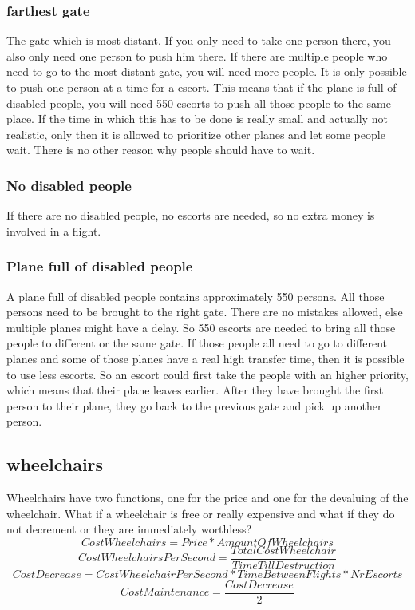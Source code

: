 \documentclass[a4paper, 11pt, notitlepage]{report}
\begin{document}
\subsubsection{farthest gate}
The gate which is most distant. If you only need to take one person there, you also only need one person to push him there. If there are multiple people who need to go to the most distant gate, you will need more people. It is only possible to push one person at a time for a escort. This means that if the plane is full of disabled people, you will need 550 escorts to push all those people to the same place. If the time in which this has to be done is really small and actually not realistic, only then it is allowed to prioritize other planes and let some people wait. There is no other reason why people should have to wait.
\subsubsection{No disabled people}
If there are no disabled people, no escorts are needed, so no extra money is involved in a flight.
\subsubsection{Plane full of disabled people}
A plane full of disabled people contains approximately 550 persons. All those persons need to be brought to the right gate. There are no mistakes allowed, else multiple planes might have a delay. So 550 escorts are needed to bring all those people to different or the same gate. If those people all need to go to different planes and some of those planes have a real high transfer time, then it is possible to use less escorts. So an escort could first take the people with an higher priority, which means that their plane leaves earlier. After they have brought the first person to their plane, they go back to the previous gate and pick up another person.
\subsection{wheelchairs}
Wheelchairs have two functions, one for the price and one for the devaluing of the wheelchair. What if a wheelchair is free or really expensive and what if they do not decrement or they are immediately worthless?\\
\begin{equation}
CostWheelchairs = Price * AmountOfWheelchairs
\end{equation}
\begin{equation}
CostWheelchairsPerSecond = \frac{TotalCostWheelchair}{TimeTillDestruction}
\end{equation}
\begin{equation}
CostDecrease = CostWheelchairPerSecond * TimeBetweenFlights * NrEscorts
\end{equation}
\begin{equation}
CostMaintenance = \frac{CostDecrease}{2}
\end{equation}
\end{document}

